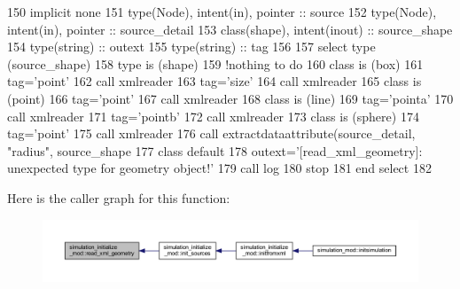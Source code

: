 \begin{DoxyCode}
150     \textcolor{keywordtype}{implicit none}
151     \textcolor{keywordtype}{type}(Node), \textcolor{keywordtype}{intent(in)}, \textcolor{keywordtype}{pointer} :: source
152     \textcolor{keywordtype}{type}(Node), \textcolor{keywordtype}{intent(in)}, \textcolor{keywordtype}{pointer} :: source\_detail
153     \textcolor{keywordtype}{class}(shape), \textcolor{keywordtype}{intent(inout)} :: source\_shape
154     \textcolor{keywordtype}{type}(string) :: outext
155     \textcolor{keywordtype}{type}(string) :: tag
156 
157     \textcolor{keywordflow}{select type} (source\_shape)
158 \textcolor{keywordflow}{    type is} (shape)
159         \textcolor{comment}{!nothing to do}
160 \textcolor{keywordflow}{    class is} (box)
161         tag=\textcolor{stringliteral}{'point'}
162         \textcolor{keyword}{call }xmlreader%
163         tag=\textcolor{stringliteral}{'size'}
164         \textcolor{keyword}{call }xmlreader%
165 \textcolor{keywordflow}{    class is} (point)
166         tag=\textcolor{stringliteral}{'point'}
167         \textcolor{keyword}{call }xmlreader%
168 \textcolor{keywordflow}{    class is} (line)
169         tag=\textcolor{stringliteral}{'pointa'}
170         \textcolor{keyword}{call }xmlreader%
171         tag=\textcolor{stringliteral}{'pointb'}
172         \textcolor{keyword}{call }xmlreader%
173 \textcolor{keywordflow}{    class is} (sphere)
174         tag=\textcolor{stringliteral}{'point'}
175         \textcolor{keyword}{call }xmlreader%
176         \textcolor{keyword}{call }extractdataattribute(source\_detail, \textcolor{stringliteral}{"radius"}, source\_shape%
177 \textcolor{keywordflow}{        class default}
178         outext=\textcolor{stringliteral}{'[read\_xml\_geometry]: unexpected type for geometry object!'}
179         \textcolor{keyword}{call }log%
180         stop
181 \textcolor{keywordflow}{    end select}
182 
\end{DoxyCode}
Here is the caller graph for this function\+:\nopagebreak
\begin{figure}[H]
\begin{center}
\leavevmode
\includegraphics[width=350pt]{namespacesimulation__initialize__mod_ab6e350f9f537c9f62e8ba5aeb023d2a6_icgraph}
\end{center}
\end{figure}
